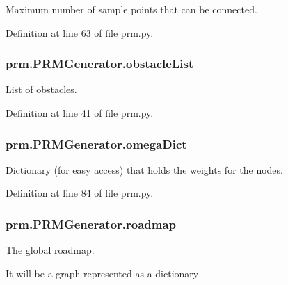 Maximum number of sample points that can be connected. 



Definition at line 63 of file prm.\-py.

\hypertarget{classprm_1_1PRMGenerator_a86b5b9254eb1e5f2c79fc32775c003e2}{
\subsubsection[{obstacle\-List}]{\setlength{\rightskip}{0pt plus 5cm}prm.\-P\-R\-M\-Generator.\-obstacle\-List}}\label{classprm_1_1PRMGenerator_a86b5b9254eb1e5f2c79fc32775c003e2}


List of obstacles. 



Definition at line 41 of file prm.\-py.

\hypertarget{classprm_1_1PRMGenerator_ad56b6bb5da1e474ab8a8099863207de3}{
\subsubsection[{omega\-Dict}]{\setlength{\rightskip}{0pt plus 5cm}prm.\-P\-R\-M\-Generator.\-omega\-Dict}}\label{classprm_1_1PRMGenerator_ad56b6bb5da1e474ab8a8099863207de3}


Dictionary (for easy access) that holds the weights for the nodes. 



Definition at line 84 of file prm.\-py.

\hypertarget{classprm_1_1PRMGenerator_a7fa851696426c3e1bbd7ff737cf33538}{
\subsubsection[{roadmap}]{\setlength{\rightskip}{0pt plus 5cm}prm.\-P\-R\-M\-Generator.\-roadmap}}\label{classprm_1_1PRMGenerator_a7fa851696426c3e1bbd7ff737cf33538}


The global roadmap. 

It will be a graph represented as a dictionary 

